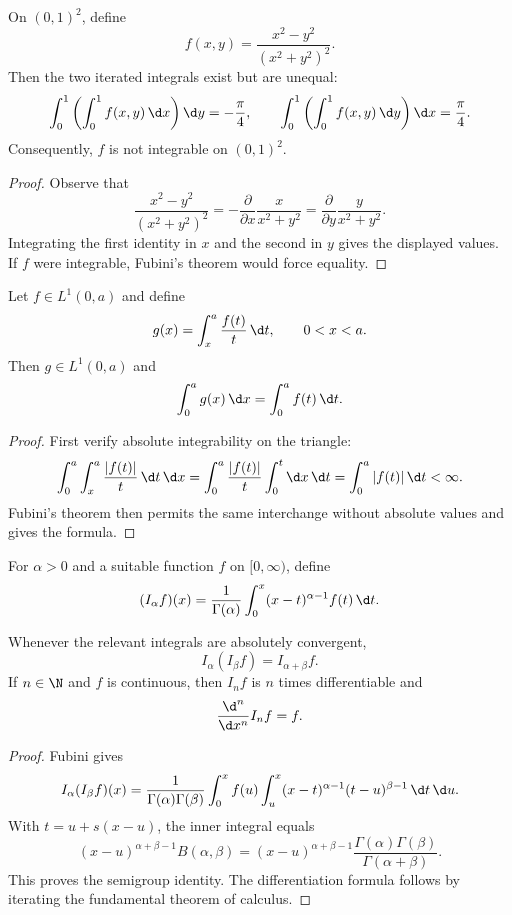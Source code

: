 \begin{exercise}
On $(0,1)^2$, define
\[
f(x,y)=\frac{x^2-y^2}{(x^2+y^2)^2}.
\]
Then the two iterated integrals exist but are unequal:
\[
\int_0^1\left(\int_0^1f(x,y)\,\d x\right)\d y=-\frac\pi4,
\qquad
\int_0^1\left(\int_0^1f(x,y)\,\d y\right)\d x=\frac\pi4.
\]
Consequently, $f$ is not integrable on $(0,1)^2$.
\end{exercise}

\begin{proof}
Observe that
\[
\frac{x^2-y^2}{(x^2+y^2)^2}
 =-\frac{\partial}{\partial x}\frac{x}{x^2+y^2}
 =\frac{\partial}{\partial y}\frac{y}{x^2+y^2}.
\]
Integrating the first identity in $x$ and the second in $y$ gives the displayed values. If $f$ were integrable, Fubini's theorem would force equality.
\end{proof}

\begin{prop}
Let $f\in L^1(0,a)$ and define
\[
g(x)=\int_x^a\frac{f(t)}t\,\d t,
\qquad0<x<a.
\]
Then $g\in L^1(0,a)$ and
\[
\int_0^ag(x)\,\d x=\int_0^af(t)\,\d t.
\]
\end{prop}

\begin{proof}
First verify absolute integrability on the triangle:
\[
\int_0^a\int_x^a\frac{|f(t)|}{t}\,\d t\,\d x
 =\int_0^a\frac{|f(t)|}{t}\int_0^t\d x\,\d t
 =\int_0^a|f(t)|\,\d t<\infty.
\]
Fubini's theorem then permits the same interchange without absolute values and gives the formula.
\end{proof}

\begin{de}
For $\alpha>0$ and a suitable function $f$ on $[0,\infty)$, define
\[
(I_\alpha f)(x)
 =\frac1{\Gamma(\alpha)}
   \int_0^x(x-t)^{\alpha-1}f(t)\,\d t.
\]
\end{de}

\begin{prop}
Whenever the relevant integrals are absolutely convergent,
\[
I_\alpha(I_\beta f)=I_{\alpha+\beta}f.
\]
If $n\in\N$ and $f$ is continuous, then $I_nf$ is $n$ times differentiable and
\[
\frac{\d^n}{\d x^n}I_nf=f.
\]
\end{prop}

\begin{proof}
Fubini gives
\[
I_\alpha(I_\beta f)(x)
 =\frac1{\Gamma(\alpha)\Gamma(\beta)}
  \int_0^xf(u)
   \int_u^x(x-t)^{\alpha-1}(t-u)^{\beta-1}\,\d t\,\d u.
\]
With $t=u+s(x-u)$, the inner integral equals
\[
(x-u)^{\alpha+\beta-1}B(\alpha,\beta)
 =(x-u)^{\alpha+\beta-1}
   \frac{\Gamma(\alpha)\Gamma(\beta)}{\Gamma(\alpha+\beta)}.
\]
This proves the semigroup identity. The differentiation formula follows by iterating the fundamental theorem of calculus.
\end{proof}

